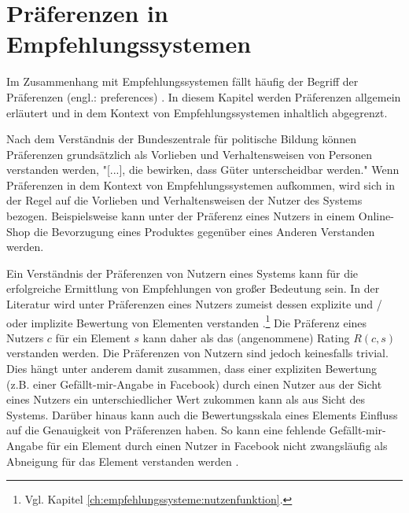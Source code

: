 \section{Präferenzen in Empfehlungssystemen}
\label{ch:empfehlungssysteme:preferences}
Im Zusammenhang mit Empfehlungssystemen fällt häufig der Begriff der Präferenzen (engl.: preferences) \cite[S. 2]{ricci:inbook}\cite[S. 11f.]{recommenderSystems:2016}\cite[S. 87]{ekstrand:article}\cite[S. 2429]{palomares:inproceedings}.
In diesem Kapitel werden Präferenzen allgemein erläutert und in dem Kontext von Empfehlungssystemen inhaltlich abgegrenzt.

Nach dem Verständnis der Bundeszentrale für politische Bildung können Präferenzen grundsätzlich als Vorlieben und Verhaltensweisen von Personen verstanden werden, "[...], die bewirken, dass Güter unterscheidbar werden."\cite{pollert:book}
Wenn Präferenzen in dem Kontext von Empfehlungssystemen aufkommen, wird sich in der Regel auf die Vorlieben und Verhaltensweisen der Nutzer des Systems bezogen.
Beispielsweise kann unter der Präferenz eines Nutzers in einem Online-Shop die Bevorzugung eines Produktes gegenüber eines Anderen Verstanden werden.

Ein Verständnis der Präferenzen von Nutzern eines Systems kann für die erfolgreiche Ermittlung von Empfehlungen von großer Bedeutung sein. %
In der Literatur wird unter Präferenzen eines Nutzers zumeist dessen explizite und / oder implizite Bewertung von Elementen verstanden \cite[S. 37]{berkovsky:2:article}\cite[S. 743]{adomavicius:inproceedings}\cite[S. 11]{recommenderSystems:2016}\cite[S. 129]{ekstrand:article}\cite[S. 899]{adomavicius:article}.\footnote{Vgl. Kapitel \ref{ch:empfehlungssysteme:nutzenfunktion}.}
Die Präferenz eines Nutzers $c$ für ein Element $s$ kann daher als das (angenommene) Rating $R(c,s)$ verstanden werden.
Die Präferenzen von Nutzern sind jedoch keinesfalls trivial.
Dies hängt unter anderem damit zusammen, dass einer expliziten Bewertung (z.B. einer Gefällt-mir-Angabe in Facebook) durch einen Nutzer aus der Sicht eines Nutzers ein unterschiedlicher Wert zukommen kann als aus Sicht des Systems.
Darüber hinaus kann auch die Bewertungsskala eines Elements Einfluss auf die Genauigkeit von Präferenzen haben.
So kann eine fehlende Gefällt-mir-Angabe für ein Element durch einen Nutzer in Facebook nicht zwangsläufig als Abneigung für das Element verstanden werden \cite[S. 11]{recommenderSystems:2016}.

